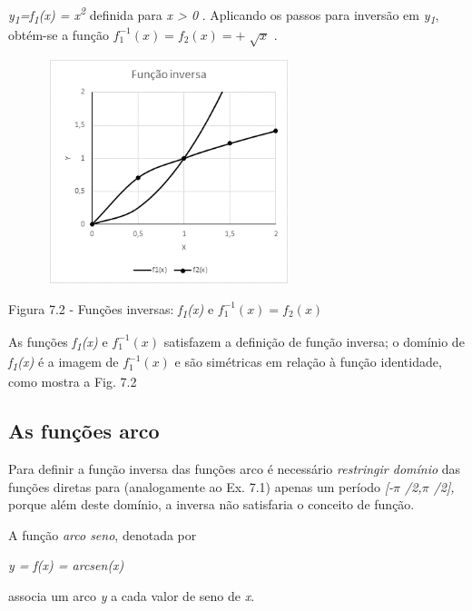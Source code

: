 \begin{texemplo}
\textit{y\textsubscript{1}=f\textsubscript{1}(x) = x\textsuperscript{2} } definida para \textit{x > 0} . Aplicando os passos para inversão em \textit{y\textsubscript{1}}, obtém-se a função  \( f_{1}^{-1} \left( x \right) =f_{2} \left( x \right) =+\sqrt[]{x} \)  .

\begin{figure}[H]
    \begin{Center}
        \includegraphics[width=2.86in,height=2.57in]{capitulos/trigonometria_e_funcoes_trigonometricas/media/image46.png}
    \end{Center}
\end{figure}

Figura 7.2 - Funções inversas: \textit{f\textsubscript{1}(x)} e  \( f_{1}^{-1} \left( x \right) =f_{2} \left( x \right)  \)

As funções  \textit{f\textsubscript{1}(x)} e  \( f_{1}^{-1} \left( x \right)  \)   satisfazem a definição de função inversa; o domínio de \textit{f\textsubscript{1}(x)}  é a imagem de  \( f_{1}^{-1} \left( x \right)  \)    e  são simétricas em relação à função identidade, como mostra a Fig. 7.2 \qedsymbol
\end{texemplo}

\subsection{As funções arco}

Para definir a função inversa das funções arco é necessário \textit{restringir domínio} das funções diretas para (analogamente ao Ex. 7.1) apenas um período \textit{[-$ \pi $ /2,$ \pi $ /2], }porque além deste domínio, a inversa não satisfaria o conceito de função.

\begin{caixa}
\begin{tdefinicao}
A função \textit{arco seno}, denotada por 

\textit{y = f(x) = arcsen(x)}

associa um arco \textit{y} a cada valor de seno de \textit{x}.
\end{tdefinicao}
\end{caixa}

